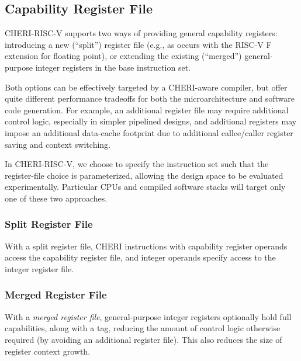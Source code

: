 \subsection{Capability Register File}

CHERI-RISC-V supports two ways of providing general capability registers:
introducing a new (``split'')
register file (e.g., as occurs with the RISC-V F extension for floating
point), or extending the existing (``merged'') general-purpose integer registers in the
base instruction set.

Both options can be effectively targeted by a CHERI-aware compiler, but offer
quite different performance tradeoffs for both the microarchitecture and
software code generation.
For example, an additional register file may require additional control logic,
especially in simpler pipelined designs, and additional registers may impose an
additional data-cache footprint due to additional callee/caller register saving and context switching.

In CHERI-RISC-V, we choose to specify the instruction set such that the
register-file choice is parameterized, allowing the design space to be
evaluated experimentally.
Particular CPUs and compiled software stacks will target only one of these two
approaches.

\subsubsection{Split Register File}

With a split register file, CHERI
instructions with capability register operands access the capability register
file, and integer operands specify access to the integer register file.


\subsubsection{Merged Register File}

With a \textit{merged register file},
general-purpose integer registers optionally hold
full
capabilities, along with a tag, reducing the amount of control logic otherwise
required (by avoiding an additional register file).
This also reduces the size of register context growth.

